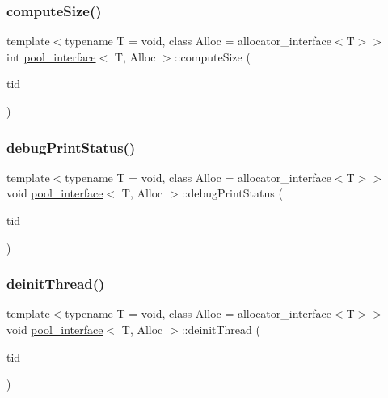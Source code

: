 \mbox{\label{classpool__interface_aff03189b1d56dbc5debba3df0807bc92}} 
\subsubsection{\texorpdfstring{compute\+Size()}{computeSize()}}
{\footnotesize\ttfamily template$<$typename T  = void, class Alloc  = allocator\+\_\+interface$<$\+T$>$$>$ \\
int \hyperlink{classpool__interface}{pool\+\_\+interface}$<$ T, Alloc $>$\+::compute\+Size (\begin{DoxyParamCaption}\item[{const int}]{tid }\end{DoxyParamCaption})\hspace{0.3cm}{\ttfamily [inline]}}

\mbox{\label{classpool__interface_a9671f9620d1bc032065aef4b05c0d51d}} 
\subsubsection{\texorpdfstring{debug\+Print\+Status()}{debugPrintStatus()}}
{\footnotesize\ttfamily template$<$typename T  = void, class Alloc  = allocator\+\_\+interface$<$\+T$>$$>$ \\
void \hyperlink{classpool__interface}{pool\+\_\+interface}$<$ T, Alloc $>$\+::debug\+Print\+Status (\begin{DoxyParamCaption}\item[{const int}]{tid }\end{DoxyParamCaption})}

\mbox{\label{classpool__interface_add48a6c2d94211154702f9543ceff76c}} 
\subsubsection{\texorpdfstring{deinit\+Thread()}{deinitThread()}}
{\footnotesize\ttfamily template$<$typename T  = void, class Alloc  = allocator\+\_\+interface$<$\+T$>$$>$ \\
void \hyperlink{classpool__interface}{pool\+\_\+interface}$<$ T, Alloc $>$\+::deinit\+Thread (\begin{DoxyParamCaption}\item[{const int}]{tid }\end{DoxyParamCaption})}

